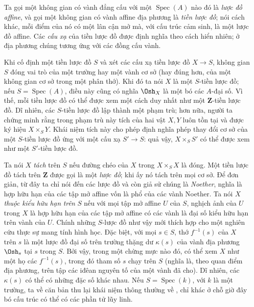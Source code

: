 Ta gọi một không gian có vành đẳng cấu với một
$\operatorname{Spec}(A)$ nào đó là \emph{lược đồ affine}, và gọi một không gian
có vành affine địa phương là \emph{tiền lược đồ}; nói cách khác, mỗi điểm của
nó có một lân cận mở mà, với cấu trúc cảm sinh, là một lược đồ affine. Các
\emph{cấu xạ} của tiền lược đồ được định nghĩa theo cách hiển nhiên; ở địa
phương chúng tương ứng với các đồng cấu vành.

Khi cố định một tiền lược đồ $S$ và xét các cấu xạ tiền lược đồ
$X\longrightarrow S$, không gian $S$ đóng vai trò của một trường hay một vành
cơ sở (hay đúng hơn, của một không gian cơ sở trong một phân thớ). Khi đó ta
nói $X$ là một $S$-tiền lược đồ; nếu $S=\operatorname{Spec}(A)$, điều này cũng
có nghĩa $\Osh_X$ là một bó các $A$-đại số. Vì thế, mỗi tiền lược đồ có thể
được xem một cách duy nhất như một $\mathbf Z$-tiền lược đồ. Dĩ nhiên, các
$S$-tiền lược đồ lập thành một phạm trù; hơn nữa, người ta chứng minh rằng
trong phạm trù này tích của hai vật $X,Y$ luôn tồn tại và được ký hiệu
$X\times_S Y$. Khái niệm tích này cho phép định nghĩa phép thay đổi cơ sở của
một $S$-tiền lược đồ ứng với một cấu xạ $S'\longrightarrow S$: quả vậy,
$X\times_S S'$ có thể được xem như một $S'$-tiền lược đồ.

Ta nói $X$ \emph{tách} trên $S$ nếu đường chéo của $X$ trong
$X\times_S X$ là đóng. Một tiền lược đồ tách trên $\mathbf Z$ được gọi là một
\emph{lược đồ}; khi ấy nó tách trên mọi cơ sở. Để đơn giản, từ đây ta chỉ nói
đến các lược đồ và còn giả sử chúng là \emph{Noether}, nghĩa là hợp hữu hạn
của các tập mở affine vốn là phổ của các vành Noether. Ta nói $X$ \emph{thuộc
kiểu hữu hạn trên} $S$ nếu với mọi tập mở affine $U$ của $S$, nghịch ảnh của
$U$ trong $X$ là hợp hữu hạn của các tập mở affine có các vành là đại số kiểu
hữu hạn trên vành của $U$. Chính những $S$-lược đồ như vậy mới thích hợp cho
một nghiên cứu thực sự mang tính hình học. Đặc biệt, với mọi $s\in S$, thớ
$f^{-1}(s)$ của $X$ trên $s$ là một lược đồ đại số trên trường thặng dư
$\kappa(s)$ của vành địa phương $\Osh_s$ tại $s$ trong $S$. Bởi vậy, trong một
chừng mực nào đó, có thể xem $X$ như một họ các 
$f^{-1}(s)$, trong đó tham số $s$ chạy trên $S$ (nghĩa là, theo quan điểm địa
phương, trên tập các iđêan nguyên tố của một vành đã cho). Dĩ nhiên, các
$\kappa(s)$ có thể có những đặc số khác nhau. Nếu
$S=\operatorname{Spec}(k)$, với $k$ là một trường, ta về căn bản thu lại khái
niệm thông thường về , chỉ khác ở chỗ giờ đây bó cấu
trúc có thể có các phần tử lũy linh.

